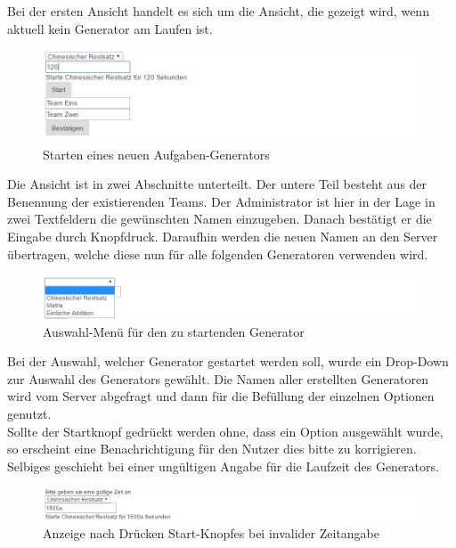 Bei der ersten Ansicht handelt es sich um die Ansicht, die gezeigt wird, wenn aktuell kein Generator am Laufen ist. \\

\begin{figure}[htp]     %
\centering
\includegraphics[width=1\textwidth]{bilder/StartNew} 
\caption[Starten eines neuen Aufgaben-Generators]{Starten eines neuen Aufgaben-Generators}
\end{figure} 

Die Ansicht ist in zwei Abschnitte unterteilt. Der untere Teil besteht aus der Benennung der existierenden Teams. Der Administrator ist hier in der Lage in zwei Textfeldern die gewünschten Namen einzugeben. Danach bestätigt er die Eingabe durch Knopfdruck. Daraufhin werden die neuen Namen an den Server übertragen, welche diese nun für alle folgenden Generatoren verwenden wird. \\

\begin{figure}[htp]     %
\centering
\includegraphics[width=1\textwidth]{bilder/StartDropDown} 
\caption[Auswahl-Menü für den zu startenden Generator]{Auswahl-Menü für den zu startenden Generator}
\end{figure} 

Bei der Auswahl, welcher Generator gestartet werden soll, wurde ein Drop-Down zur Auswahl des Generators gewählt. Die Namen aller erstellten Generatoren wird vom Server abgefragt und dann für die Befüllung der einzelnen Optionen genutzt.\\
Sollte der Startknopf gedrückt werden ohne, dass ein Option ausgewählt wurde, so erscheint eine Benachrichtigung für den Nutzer dies bitte zu korrigieren. Selbiges geschieht bei einer ungültigen Angabe für die Laufzeit des Generators. \\

\begin{figure}[htp]     %
\centering
\includegraphics[width=1\textwidth]{bilder/InvalidTime} 
\caption[Anzeige nach Drücken Start-Knopfes bei invalider Zeitangabe]{Anzeige nach Drücken Start-Knopfes bei invalider Zeitangabe}
\end{figure} 
 

